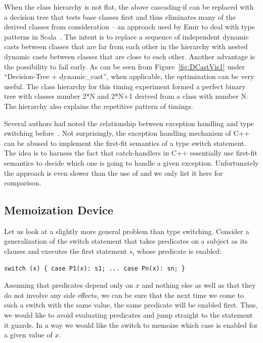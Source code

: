 When the class hierarchy is not flat, the above cascading-if can be replaced 
with a decision tree that tests base classes first and thus eliminates many of 
the derived classes from consideration -- an approach used by Emir to deal with 
type patterns in Scala~\cite[]{EmirThesis}. The intent is to 
replace a sequence of independent dynamic casts between classes that are far 
from each other in the hierarchy with nested dynamic casts between classes that 
are close to each other. Another advantage is the possibility to fail early. 
As can be seen from Figure~\ref{fig:DCastVis1} under ``Decision-Tree + 
dynamic\_cast'', when applicable, the optimization can be very useful. The class
hierarchy for this timing experiment formed a perfect binary tree with 
classes number 2*N and 2*N+1 derived from a class with number N. The hierarchy 
also explains the repetitive pattern of timings.

Several authors had noted the relationship between exception handling and type 
switching before~\cite{Glew99,ML2000}. Not surprisingly, the exception handling 
mechanism of C++ can be abused to implement the first-fit semantics of a type 
switch statement. The idea is to harness the fact that catch-handlers in C++ 
essentially use first-fit semantics to decide which one is going to handle a 
given exception. Unfortunately the approach is even slower than the use of 
 and we only list it here for comparison.

\subsection{Memoization Device}
\label{sec:memdev}

Let us look at a slightly more general problem than type switching. Consider a 
generalization of the switch statement that takes predicates on a subject as its 
clauses and executes the first statement $s_i$ whose predicate is enabled: 

\begin{lstlisting}[keepspaces]
switch (x) { case P1(x): s1; ... case Pn(x): sn; }
\end{lstlisting}

\noindent
Assuming that predicates depend only on $x$ and nothing else as well as that 
they do not involve any side effects, we can be sure that the next time we come 
to such a switch with the same value, the same predicate will be enabled 
first. Thus, we would like to avoid evaluating predicates and jump straight to 
the statement it guards. In a way we would like the switch to memoize which 
case is enabled for a given value of $x$.

